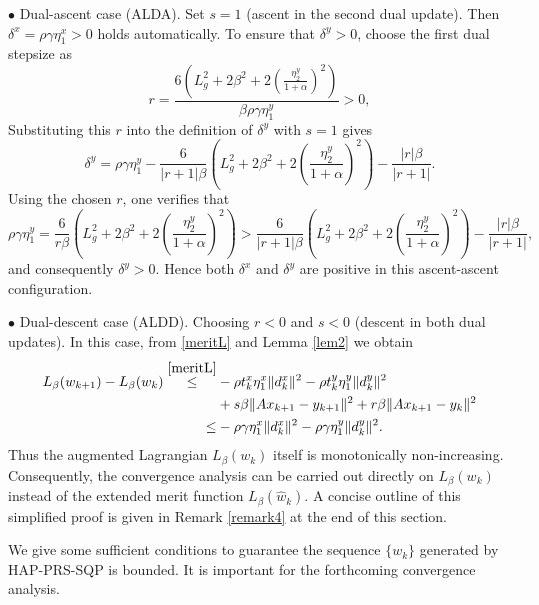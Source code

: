 \documentclass[pdflatex,sn-mathphys-num]{sn-jnl}%
\theoremstyle{thmstyleone}%
\theoremstyle{thmstyletwo}%
\theoremstyle{thmstylethree}%
\begin{document}
$\bullet$ Dual-ascent case (ALDA). Set $s=1$ (ascent in the second dual update). Then $\delta^x=\rho\gamma\eta^x_1>0$ holds automatically. To ensure that $\delta^y>0$, choose the first dual stepsize as
\[
r= \frac{6(L_{g}^{2}+2\beta^{2}+2(\frac{\eta_2^y}{1+\alpha})^2)}
{\beta\rho\gamma\eta^y_1}>0,
\]
Substituting this $r$ into the definition of $\delta^y$ with $s=1$ gives
\[\delta^y =\rho\gamma\eta^y_1 -\frac{6}{|r+1|\beta}\left(L_{g}^{2}+2\beta^{2}+2\left(\frac{\eta_2^y}{1+\alpha}\right)^2\right)-\frac{|r|\beta}{|r+1|}.\]
Using the chosen $r$, one verifies that 
\[
	\rho\gamma\eta^y_1 =\frac{6}{r\beta}(L_{g}^{2}+2\beta^{2}+2(\frac{\eta_2^y}{1+\alpha})^2)
	>\frac{6}{|r+1|\beta}(L_{g}^{2}+2\beta^{2}+2(\frac{\eta_2^y}{1+\alpha})^2)-\frac{|r|\beta}{|r+1|},
\]
and consequently $\delta^y>0$. Hence both $\delta^x$ and $\delta^y$ are positive in this ascent-ascent configuration.

$\bullet$ Dual-descent case (ALDD). Choosing $r<0$ and $s<0$ (descent in both dual updates). In this case, from \eqref{meritL} and Lemma \ref{lem2} we obtain
\begin{align}
	L_{\beta}({w}_{k+1})-L_{\beta}({w}_{k}) \overset{\eqref{meritL}}{\leq} &-\rho t_k^x\eta^x_1 \|d_{k}^{x}\|^{2}-\rho t_k^y\eta^y_1 \|d_{k}^{y}\|^{2}\nonumber\\
	&+s \beta\|A x_{k+1}-y_{k+1}\|^{2}+r \beta\|A x_{k+1}-y_{k}\|^{2}\nonumber\\
	\leq &-\rho \gamma\eta^x_1 \|d_{k}^{x}\|^{2}-\rho \gamma\eta^y_1 \|d_{k}^{y}\|^{2}.\label{ALDD-merit-dec}
\end{align}
Thus the augmented Lagrangian $L_{\beta}(w_{k})$ itself is monotonically non-increasing. Consequently, the convergence analysis can be carried out directly on $L_{\beta}(w_k)$ instead of the extended merit function $L_{\beta}(\hat{w}_k)$. A concise outline of this simplified proof is given in Remark \ref{remark4} at the end of this section.



We give some sufficient conditions to guarantee the sequence $\{w_k\}$ generated by HAP-PRS-SQP is bounded. It is important for the forthcoming convergence analysis.
\end{document}
